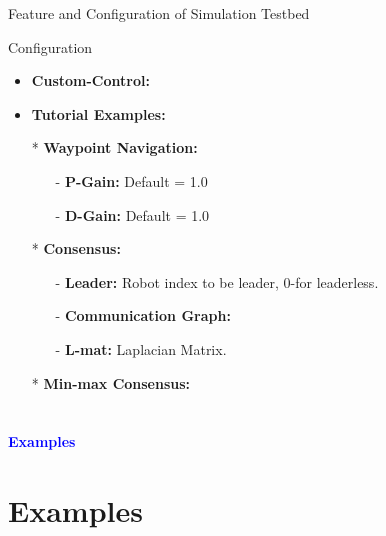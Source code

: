 \documentclass[10pt]{beamer}
\begin{document}
\begin{frame}{Feature and Configuration of Simulation Testbed}
\begin{block}{Configuration}
\begin{minipage}{0.47\textwidth}
\begin{itemize}
			      \begin{itemize}
				      \item \textbf{Custom-Control: }
				      \item \textbf{Tutorial Examples: }
				      \item[*] \textbf{Waypoint Navigation:}
				            \begin{itemize}
					            \item[-] \textbf{P-Gain: }Default = 1.0
					            \item[-] \textbf{D-Gain: }Default = 1.0
				            \end{itemize}
				      \item[*] \textbf{Consensus: }
				            \begin{itemize}
					            \item[-] \textbf{Leader: }Robot index to be leader, 0-for leaderless.
					            \item[-] \textbf{Communication Graph: }
					            \item[-] \textbf{L-mat: } Laplacian Matrix.
				            \end{itemize}
				      \item[*] \textbf{Min-max Consensus: }
			      \end{itemize}
		\end{itemize}
	\end{minipage}		
\end{block}
\end{frame}

\section*{}
\begin{frame}{}
	\huge{\centerline{\textcolor{blue}{\textbf{Examples}}}}
\end{frame}
\section{Examples}
\end{document}
